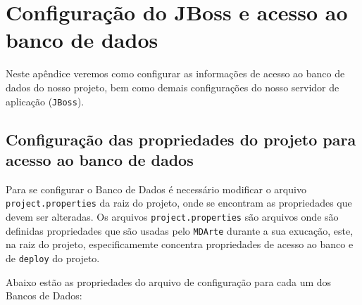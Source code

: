 \appendix
\chapter{Configuração do JBoss e acesso ao banco de dados}
\label{jboss-config}
Neste apêndice veremos como configurar as informações de acesso ao banco de
dados do nosso projeto, bem como demais configurações do nosso servidor de
aplicação (\texttt{JBoss}).

\section{Configuração das propriedades do projeto para acesso ao banco de dados}
Para se configurar o Banco de Dados é necessário modificar o arquivo
\texttt{project.properties} da raiz do projeto, onde se encontram as
propriedades que devem ser alteradas. Os arquivos
\texttt{project.properties} são arquivos onde são definidas propriedades que são
usadas pelo \texttt{MDArte} durante a sua exucação, este, na raiz do projeto,
especificamemte concentra propriedades de acesso ao banco e de \texttt{deploy}
do projeto.

Abaixo estão as propriedades do arquivo de
configuração para cada um dos Bancos de Dados:


